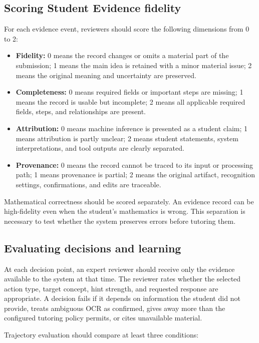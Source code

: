 \documentclass[11pt]{article}
\begin{document}
\subsection{Scoring Student Evidence fidelity}

For each evidence event, reviewers should score the following dimensions from 0 to 2:

\begin{itemize}
    \item \textbf{Fidelity:} 0 means the record changes or omits a material part of the submission; 1 means the main idea is retained with a minor material issue; 2 means the original meaning and uncertainty are preserved.
    \item \textbf{Completeness:} 0 means required fields or important steps are missing; 1 means the record is usable but incomplete; 2 means all applicable required fields, steps, and relationships are present.
    \item \textbf{Attribution:} 0 means machine inference is presented as a student claim; 1 means attribution is partly unclear; 2 means student statements, system interpretations, and tool outputs are clearly separated.
    \item \textbf{Provenance:} 0 means the record cannot be traced to its input or processing path; 1 means provenance is partial; 2 means the original artifact, recognition settings, confirmations, and edits are traceable.
\end{itemize}

Mathematical correctness should be scored separately. An evidence record can be high-fidelity even when the student's mathematics is wrong. This separation is necessary to test whether the system preserves errors before tutoring them.

\subsection{Evaluating decisions and learning}

At each decision point, an expert reviewer should receive only the evidence available to the system at that time. The reviewer rates whether the selected action type, target concept, hint strength, and requested response are appropriate. A decision fails if it depends on information the student did not provide, treats ambiguous OCR as confirmed, gives away more than the configured tutoring policy permits, or cites unavailable material.

Trajectory evaluation should compare at least three conditions:
\end{document}
